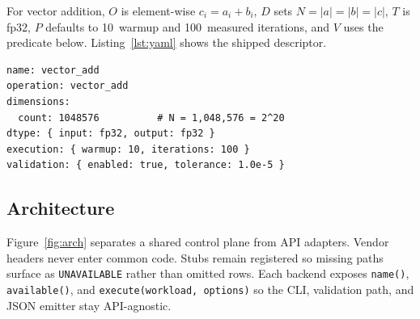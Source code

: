\documentclass[11pt,a4paper]{article}
\begin{document}
For vector addition, $O$ is element-wise $c_i=a_i+b_i$,
$D$ sets $N=|a|=|b|=|c|$, $T$ is fp32, $P$ defaults to 10~warmup and
100~measured iterations, and $V$ uses the predicate below.
Listing~\ref{lst:yaml} shows the shipped descriptor.

\begin{lstlisting}[style=yaml,caption={Vector-add workload
(\texttt{examples/vector\_add/vector\_add.yaml}).},label={lst:yaml}]
name: vector_add
operation: vector_add
dimensions:
  count: 1048576          # N = 1,048,576 = 2^20
dtype: { input: fp32, output: fp32 }
execution: { warmup: 10, iterations: 100 }
validation: { enabled: true, tolerance: 1.0e-5 }
\end{lstlisting}

\subsection{Architecture}

Figure~\ref{fig:arch} separates a shared control plane from API adapters.
Vendor headers never enter common code. Stubs remain registered so missing
paths surface as \texttt{UNAVAILABLE} rather than omitted rows. Each backend
exposes \texttt{name()}, \texttt{available()}, and
\texttt{execute(workload, options)} so the CLI, validation path, and JSON
emitter stay API-agnostic.
\end{document}
